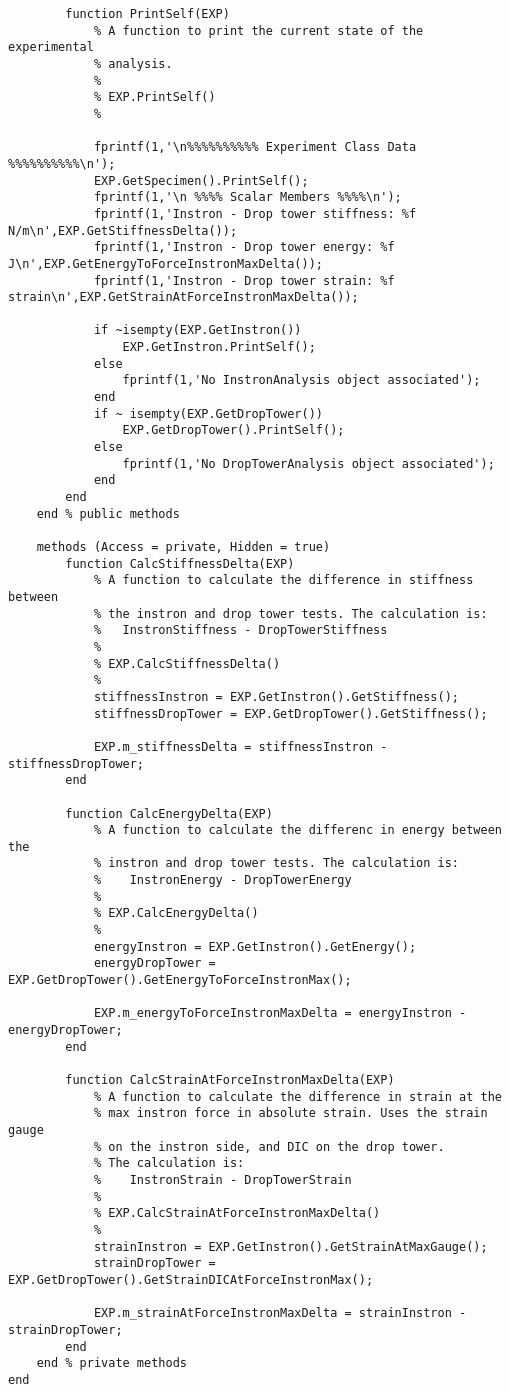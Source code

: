 \begin{lstlisting}
        function PrintSelf(EXP)
            % A function to print the current state of the experimental
            % analysis.
            %
            % EXP.PrintSelf()
            %
            
            fprintf(1,'\n%%%%%%%%%% Experiment Class Data %%%%%%%%%%\n');
            EXP.GetSpecimen().PrintSelf();
            fprintf(1,'\n %%%% Scalar Members %%%%\n');
            fprintf(1,'Instron - Drop tower stiffness: %f N/m\n',EXP.GetStiffnessDelta());
            fprintf(1,'Instron - Drop tower energy: %f J\n',EXP.GetEnergyToForceInstronMaxDelta());
            fprintf(1,'Instron - Drop tower strain: %f strain\n',EXP.GetStrainAtForceInstronMaxDelta());
            
            if ~isempty(EXP.GetInstron())
                EXP.GetInstron.PrintSelf();
            else
                fprintf(1,'No InstronAnalysis object associated');
            end
            if ~ isempty(EXP.GetDropTower())
                EXP.GetDropTower().PrintSelf();
            else
                fprintf(1,'No DropTowerAnalysis object associated');
            end
        end
    end % public methods
    
    methods (Access = private, Hidden = true)
        function CalcStiffnessDelta(EXP)
            % A function to calculate the difference in stiffness between
            % the instron and drop tower tests. The calculation is:
            %   InstronStiffness - DropTowerStiffness
            %
            % EXP.CalcStiffnessDelta()
            %
            stiffnessInstron = EXP.GetInstron().GetStiffness();
            stiffnessDropTower = EXP.GetDropTower().GetStiffness();
            
            EXP.m_stiffnessDelta = stiffnessInstron - stiffnessDropTower;
        end
        
        function CalcEnergyDelta(EXP)
            % A function to calculate the differenc in energy between the
            % instron and drop tower tests. The calculation is:
            %    InstronEnergy - DropTowerEnergy
            %
            % EXP.CalcEnergyDelta()
            %
            energyInstron = EXP.GetInstron().GetEnergy();
            energyDropTower = EXP.GetDropTower().GetEnergyToForceInstronMax();
            
            EXP.m_energyToForceInstronMaxDelta = energyInstron - energyDropTower;
        end
        
        function CalcStrainAtForceInstronMaxDelta(EXP)
            % A function to calculate the difference in strain at the 
            % max instron force in absolute strain. Uses the strain gauge
            % on the instron side, and DIC on the drop tower.
            % The calculation is:
            %    InstronStrain - DropTowerStrain
            %
            % EXP.CalcStrainAtForceInstronMaxDelta()
            %
            strainInstron = EXP.GetInstron().GetStrainAtMaxGauge();
            strainDropTower = EXP.GetDropTower().GetStrainDICAtForceInstronMax();
            
            EXP.m_strainAtForceInstronMaxDelta = strainInstron - strainDropTower;
        end
    end % private methods
end
\end{lstlisting}
